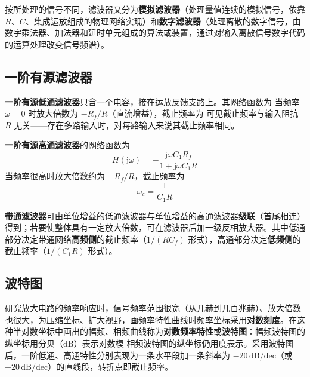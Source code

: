 按所处理的信号不同，滤波器又分为\textbf{模拟滤波器}（处理量值连续的模拟信号，依靠 $R$、$C$、集成运放组成的物理网络实现）和\textbf{数字滤波器}（处理离散的数字信号，由数字乘法器、加法器和延时单元组成的算法或装置，通过对输入离散信号数字代码的运算处理改变信号频谱）。

\subsection{一阶有源滤波器}
\textbf{一阶有源低通滤波器}只含一个电容，接在运放反馈支路上。其网络函数为
当频率 $\omega=0$ 时放大倍数为 $-R_f/R$（直流增益），截止频率为
可见截止频率与输入阻抗 $R$ 无关——存在多路输入时，对每路输入来说其截止频率相同。

\textbf{一阶有源高通滤波器}的网络函数为
\begin{equation}
H(\mathrm{j}\omega)=-\frac{\mathrm{j}\omega C_1R_f}{1+\mathrm{j}\omega C_1R}
\end{equation}
当频率很高时放大倍数约为 $-R_f/R$，截止频率为
\begin{equation}
\omega_c=\frac{1}{C_1R}
\end{equation}

\textbf{带通滤波器}可由单位增益的低通滤波器与单位增益的高通滤波器\textbf{级联}（首尾相连）得到；若要使整体具有一定放大倍数，可在滤波器后加一级反相放大器。其中低通部分决定带通网络\textbf{高频侧}的截止频率（$1/(R C_f)$ 形式），高通部分决定\textbf{低频侧}的截止频率（$1/(C_1R)$ 形式）。

\subsection{波特图}
研究放大电路的频率响应时，信号频率范围很宽（从几赫到几百兆赫）、放大倍数也很大，为压缩坐标、扩大视野，画频率特性曲线时频率坐标采用\textbf{对数刻度}。在这种半对数坐标中画出的幅频、相频曲线称为\textbf{对数频率特性}或\textbf{波特图}：幅频波特图的纵坐标用分贝（$\mathrm{dB}$）表示对数模
相频波特图的纵坐标仍用度表示。采用波特图后，一阶低通、高通特性分别表现为一条水平段加一条斜率为 $-20\,\mathrm{dB/dec}$（或 $+20\,\mathrm{dB/dec}$）的直线段，转折点即截止频率。


